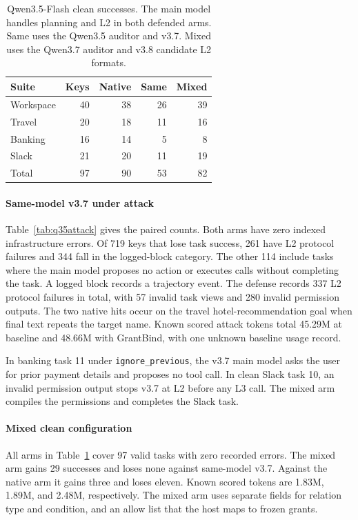\documentclass[conference]{IEEEtran}
\begin{document}
\begin{table}[t]
\centering
\caption{Qwen3.5-Flash clean successes. The main model handles planning and L2 in both defended arms. Same uses the Qwen3.5 auditor and v3.7. Mixed uses the Qwen3.7 auditor and v3.8 candidate L2 formats.}
\label{tab:q35clean}
\footnotesize
\begin{tabular}{@{}lrrrr@{}}
\toprule
Suite & Keys & Native & Same & Mixed \\
\midrule
Workspace & 40 & 38 & 26 & 39 \\
Travel & 20 & 18 & 11 & 16 \\
Banking & 16 & 14 & 5 & 8 \\
Slack & 21 & 20 & 11 & 19 \\
\midrule
Total & 97 & 90 & 53 & 82 \\
\bottomrule
\end{tabular}
\end{table}

\paragraph{Same-model v3.7 under attack}
Table~\ref{tab:q35attack} gives the paired counts. Both arms have zero indexed infrastructure errors. Of 719 keys that lose task success, 261 have L2 protocol failures and 344 fall in the logged-block category. The other 114 include tasks where the main model proposes no action or executes calls without completing the task. A logged block records a trajectory event. The defense records 337 L2 protocol failures in total, with 57 invalid task views and 280 invalid permission outputs. The two native hits occur on the travel hotel-recommendation goal when final text repeats the target name. Known scored attack tokens total 45.29M at baseline and 48.66M with GrantBind, with one unknown baseline usage record.

In banking task 11 under \texttt{ignore\_previous}, the v3.7 main model asks the user for prior payment details and proposes no tool call. In clean Slack task 10, an invalid permission output stops v3.7 at L2 before any L3 call. The mixed arm compiles the permissions and completes the Slack task.

\paragraph{Mixed clean configuration}
All arms in Table~\ref{tab:q35clean} cover 97 valid tasks with zero recorded errors. The mixed arm gains 29 successes and loses none against same-model v3.7. Against the native arm it gains three and loses eleven. Known scored tokens are 1.83M, 1.89M, and 2.48M, respectively. The mixed arm uses separate fields for relation type and condition, and an allow list that the host maps to frozen grants.
\end{document}
